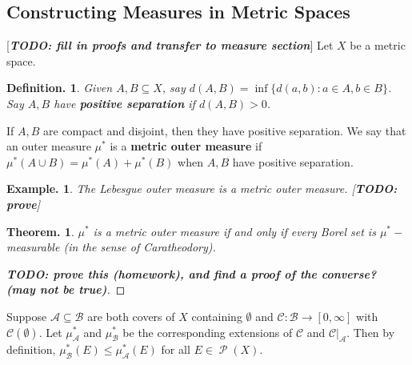 \documentclass[11pt, a4paper]{memoir}
\theoremstyle{change}
\newtheorem{theorem}{Theorem.}[section]
\theoremstyle{plain}
\theoremstyle{nonumberplain}
\newtheorem{definition}{Definition.}
\newtheorem{example}{Example.}
\newtheorem{proof}{Proof}
\DeclareMathOperator{\ps}{{\mathcal{P}}}
\newcommand{\defn}[1]{{\boldmath\bfseries #1}}
\newcommand{\TODO}[1]{[\textit{\textbf{TODO: #1}}]}
\numberwithin{equation}{section}
\begin{document}
\subsection{Constructing Measures in Metric Spaces}
\TODO{fill in proofs and transfer to measure section}
Let $X$ be a metric space.
\begin{definition}
    Given $A,B\subseteq X$, say $d(A,B)=\inf\{d(a,b):a\in A,b\in B\}$.
    Say $A,B$ have \defn{positive separation} if $d(A,B)>0$.
\end{definition}
If $A,B$ are compact and disjoint, then they have positive separation.
We say that an outer measure $\mu^*$ is a \defn{metric outer measure} if $\mu^*(A\cup B)=\mu^*(A)+\mu^*(B)$ when $A,B$ have positive separation.
\begin{example}
    The Lebesgue outer measure is a metric outer measure.
    \TODO{prove}
\end{example}
\begin{theorem}
    $\mu^*$ is a metric outer measure if and only if every Borel set is $\mu^*-$measurable (in the sense of Caratheodory).
\end{theorem}
\begin{proof}
    \TODO{prove this (homework), and find a proof of the converse? (may not be true)}
\end{proof}
Suppose $\mathcal{A}\subseteq\mathcal{B}$ are both covers of $X$ containing $\emptyset$ and $\mathcal{C}:\mathcal{B}\to[0,\infty]$ with $\mathcal{C}(\emptyset)$.
Let $\mu^*_{\mathcal{A}}$ and $\mu^*_{\mathcal{B}}$ be the corresponding extensions of $\mathcal{C}$ and $\mathcal{C}|_{\mathcal{A}}$.
Then by definition, $\mu^*_{\mathcal{B}}(E)\leq\mu^*_{\mathcal{A}}(E)$ for all $E\in\ps(X)$.
\end{document}
